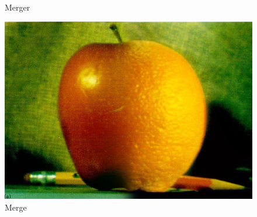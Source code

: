 \documentclass{article}
\begin{document}
    \begin{figure}[!htb]
      \caption{Merger}
    \endminipage \hfill
      \includegraphics[scale=.3]{./blending/ao/final_2.png}
      \caption{Merge}
    \endminipage \hfill
    \end{figure}

    \phantom{}\\
    
\end{document}
